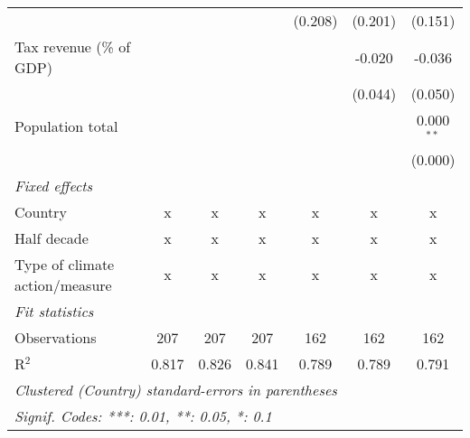 \begin{tabular}{lcccccc}
                                                      &         &               &                & (0.208)        & (0.201)        & (0.151)\\   
   Tax revenue (\% of GDP)                            &         &               &                &                & -0.020         & -0.036\\   
                                                      &         &               &                &                & (0.044)        & (0.050)\\   
   Population total                                   &         &               &                &                &                & 0.000$^{**}$\\   
                                                      &         &               &                &                &                & (0.000)\\   
   \emph{Fixed effects}\\
   Country                                            & x       & x             & x              & x              & x              & x\\  
   Half decade                                        & x       & x             & x              & x              & x              & x\\  
   Type of climate action/measure                     & x       & x             & x              & x              & x              & x\\  
   \midrule \emph{Fit statistics}\\
   Observations                                       & 207     & 207           & 207            & 162            & 162            & 162\\  
   R$^2$                                              & 0.817   & 0.826         & 0.841          & 0.789          & 0.789          & 0.791\\  
   \midrule
   \multicolumn{7}{l}{\emph{Clustered (Country) standard-errors in parentheses}}\\
   \multicolumn{7}{l}{\emph{Signif. Codes: ***: 0.01, **: 0.05, *: 0.1}}\\
\end{tabular}
\par\endgroup



